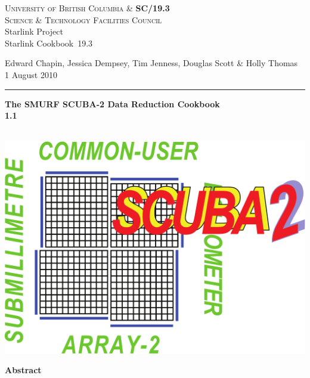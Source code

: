 \documentclass[twoside,11pt]{article}
\newcommand{\stardoccategory}  {Starlink Cookbook}
\newcommand{\stardocinitials}  {SC}
\newcommand{\stardocnumber}    {19.3}
\newcommand{\stardocauthors}   {Edward Chapin, Jessica Dempsey, Tim Jenness, Douglas Scott \& Holly Thomas}
\newcommand{\stardocdate}      {1 August 2010}
\newcommand{\stardoctitle}     {The SMURF SCUBA-2 Data Reduction Cookbook}
\newcommand{\stardocversion}   {1.1}
\newcommand{\stardocmanual}    {\ }
\newcommand{\stardocname}{\stardocinitials /\stardocnumber}
\newenvironment{latexonly}{}{}
\renewcommand{\_}{\texttt{\symbol{95}}}
\begin{document}
\thispagestyle{empty}

\begin{latexonly}
   \textsc{University of British Columbia \&} \hfill \textbf{\stardocname}\\
   {\textsc{Science \& Technology Facilities Council}}\\
   {\large Starlink Project\\}
   {\large \stardoccategory\ \stardocnumber}
   \begin{flushright}
   \stardocauthors\\
   \stardocdate
   \end{flushright}
   \vspace{-4mm}
   \rule{\textwidth}{0.5mm}
   \vspace{5mm}
   \begin{center}
   {\Huge\textbf{\stardoctitle \\ [2.5ex]}}
   {\LARGE\textbf{\stardocversion \\ [4ex]}}
   {\Huge\textbf{\stardocmanual}}
   \end{center}
   \vspace{5mm}

\begin{center}
\hspace{1.3in}\includegraphics[scale=0.3]{sc19_logo}
\end{center}

   \vspace{10mm}
   \begin{center}
      {\Large\textbf{Abstract}}
   \end{center}
\end{latexonly}
\end{document}
